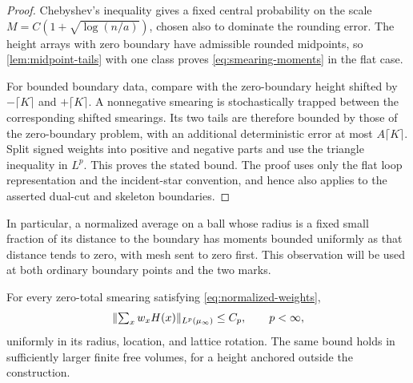 \begin{proof}
Chebyshev's inequality gives a fixed central probability on the scale
$M=C(1+\sqrt{\log(n/a)})$, chosen also to dominate the rounding error.
The height arrays with zero boundary have admissible rounded midpoints,
so \cref{lem:midpoint-tails} with one class proves
\eqref{eq:smearing-moments} in the flat case.

For bounded boundary data, compare with the zero-boundary height shifted
by $-\lceil K\rceil$ and $+\lceil K\rceil$.  A nonnegative smearing is
stochastically trapped between the corresponding shifted smearings.
Its two tails are therefore bounded by those of the zero-boundary problem,
with an additional deterministic error at most $A\lceil K\rceil$.
Split signed weights into positive and negative parts and use the triangle
inequality in $L^p$.  This proves the stated bound.  The proof uses only
the flat loop representation and the incident-star convention, and hence
also applies to the asserted dual-cut and skeleton boundaries.
\end{proof}

In particular, a normalized average on a ball whose radius is a fixed
small fraction of its distance to the boundary has moments bounded
uniformly as that distance tends to zero, with mesh sent to zero first.
This observation will be used at both ordinary boundary points and the
two marks.

\begin{proposition}\label{prop:plane-moments}
For every zero-total smearing satisfying \eqref{eq:normalized-weights},
\begin{equation}\label{eq:plane-zero-total-moments}
 \lVert\textstyle\sum_x w_xH(x)\rVert_{L^p(\mu_\infty)}\leq C_p,
 \qquad p<\infty,
\end{equation}
uniformly in its radius, location, and lattice rotation.  The same bound
holds in sufficiently larger finite free volumes, for a height anchored
outside the construction.
\end{proposition}

